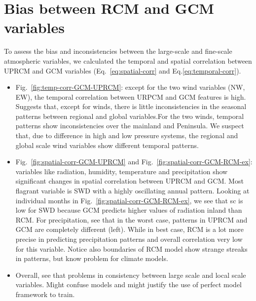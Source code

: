 \documentclass[a4paper,11pt,oneside]{report}
\begin{document}
\section{Bias between RCM and GCM variables}
To assess the bias and inconsistencies between the large-scale and fine-scale atmospheric variables, we calculated the temporal and spatial correlation between UPRCM and GCM variables (Eq.~\ref{eq:spatial-corr} and Eq.\ref{eq:temporal-corr}). 
\begin{itemize}
    \item Fig.~\ref{fig:temp-corr-GCM-UPRCM}: except for the two wind variables (NW, EW), the temporal correlation between URPCM and GCM features is high. Suggests that, except for winds, there is little inconsistencies in the seasonal patterns between regional and global variables.For the two winds, temporal patterns show inconsistencies over the mainland and Peninsula. We suspect that, due to difference in high and low pressure systems, the regional and global scale wind variables show different temporal patterns. 
    \item Fig.~\ref{fig:spatial-corr-GCM-UPRCM} and Fig.~\ref{fig:spatial-corr-GCM-RCM-ex}: variables like radiation, humidity, temperature and precipitation show significant changes in spatial correlation between UPRCM and GCM. Most flagrant variable is SWD with a highly oscillating annual pattern. Looking at individual months in Fig.~\ref{fig:spatial-corr-GCM-RCM-ex}, we see that sc is low for SWD because GCM predicts higher values of radiation inland than RCM. For precipitation, see that in the worst case, patterns in UPRCM and GCM are completely different (left). While in best case, RCM is a lot more precise in predicting precipitation patterns and overall correlation very low for this variable. Notice also boundaries of RCM model show strange streaks in patterns, but know problem for climate models.  
    \item Overall, see that problems in consistency between large scale and local scale variables. Might confuse models and might justify the use of perfect model framework to train. 
\end{itemize}
\end{document}
